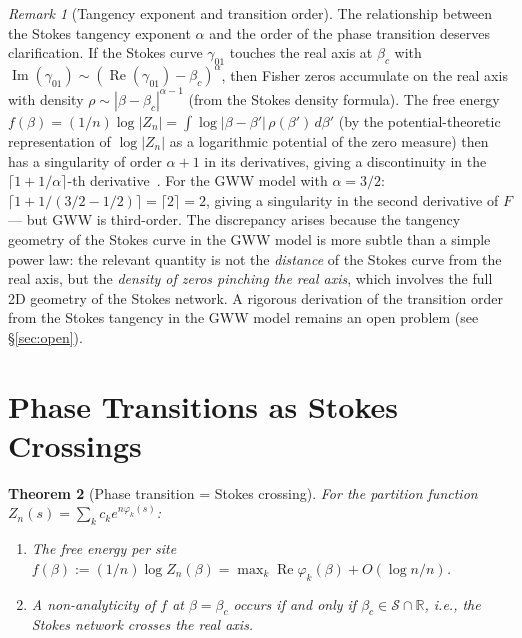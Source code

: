 \documentclass[12pt]{article}
\newtheorem{theorem}{Theorem}[section]
\theoremstyle{definition}
\theoremstyle{remark}
\newtheorem{remark}[theorem]{Remark}
\newcommand{\re}{\operatorname{Re}}
\newcommand{\im}{\operatorname{Im}}
\newcommand{\R}{\mathbb{R}}
\begin{document}
\begin{remark}[Tangency exponent and transition order]
\label{rem:tangency}
The relationship between the Stokes tangency exponent $\alpha$ and
the order of the phase transition deserves clarification.  If the
Stokes curve $\gamma_{01}$ touches the real axis at $\beta_c$ with
$\im(\gamma_{01}) \sim (\re(\gamma_{01}) - \beta_c)^\alpha$, then
Fisher zeros accumulate on the real axis with density
$\rho \sim |\beta - \beta_c|^{\alpha - 1}$ (from the Stokes
density formula).  The free energy
$f(\beta) = (1/n)\log|Z_n| = \int \log|\beta - \beta'|\,
\rho(\beta')\,d\beta'$ (by the potential-theoretic representation
of $\log|Z_n|$ as a logarithmic potential of the zero measure)
then has a singularity of order $\alpha + 1$ in its derivatives,
giving a discontinuity in the
$\lceil 1 + 1/\alpha \rceil$-th derivative~\cite{LeeYang52}.  For the GWW model with
$\alpha = 3/2$: $\lceil 1 + 1/(3/2 - 1/2) \rceil = \lceil 2 \rceil = 2$,
giving a singularity in the second derivative of $F$ --- but GWW is
third-order.  The discrepancy arises because the tangency geometry
of the Stokes curve in the GWW model is more subtle than a simple
power law: the relevant quantity is not the \emph{distance} of the
Stokes curve from the real axis, but the \emph{density of zeros
pinching the real axis}, which involves the full 2D geometry of the
Stokes network.  A rigorous derivation of the transition order
from the Stokes tangency in the GWW model remains an open problem
(see \S\ref{sec:open}).
\end{remark}

\section{Phase Transitions as Stokes Crossings}
\label{sec:phase}

\begin{theorem}[Phase transition = Stokes crossing]
\label{thm:phase_transition}
For the partition function $Z_n(s) = \sum_k c_k e^{n\varphi_k(s)}$:
\begin{enumerate}[label=(\roman*)]
\item The free energy per site $f(\beta) := (1/n)\log Z_n(\beta)
  = \max_k \re\varphi_k(\beta) + O(\log n / n)$.
\item A non-analyticity of $f$ at $\beta = \beta_c$ occurs if and
  only if $\beta_c \in \mathcal{S} \cap \R$, i.e., the Stokes
  network crosses the real axis.
\end{enumerate}
\end{theorem}
\end{document}
